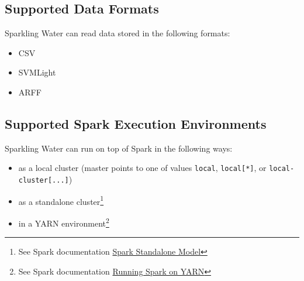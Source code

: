 \subsection{Supported Data Formats}

Sparkling Water can read data stored in the following formats:

\begin{itemize}
  \item CSV
  \item SVMLight
  \item ARFF
\end{itemize}

\subsection{Supported Spark Execution Environments}

Sparkling Water can run on top of Spark in the following ways:

\begin{itemize}
  \item as a local cluster (master points to one of values \texttt{local},
\texttt{local[*]}, or \texttt{local-cluster[...]})
  \item as a standalone cluster\footnote{See Spark documentation
\href{http://spark.apache.org/docs/latest/spark-standalone.html}{Spark
Standalone Model}}
  \item in a YARN environment\footnote{See Spark documentation \href{http://spark.apache.org/docs/latest/running-on-yarn.html}{Running
Spark on YARN}}

\end{itemize}

